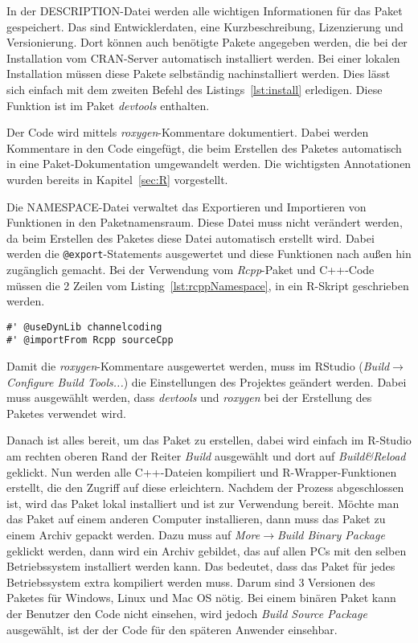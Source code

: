 In der DESCRIPTION-Datei werden alle wichtigen Informationen für das Paket gespeichert. Das sind Entwicklerdaten, eine Kurzbeschreibung, Lizenzierung und Versionierung. Dort können auch benötigte Pakete angegeben werden, die bei der Installation vom CRAN-Server automatisch installiert werden. Bei einer lokalen Installation müssen diese Pakete selbständig nachinstalliert werden. Dies lässt sich einfach mit dem zweiten Befehl des Listings~\ref{lst:install} erledigen. Diese Funktion ist im Paket \emph{devtools} enthalten. \cite[67-82]{wickham2015r}

Der Code wird mittels \emph{roxygen}-Kommentare dokumentiert. Dabei werden Kommentare in den Code eingefügt, die beim Erstellen des Paketes automatisch in eine Paket-Dokumentation umgewandelt werden. Die wichtigsten Annotationen wurden bereits in Kapitel~\ref{sec:R} vorgestellt. \cite[83-110]{wickham2015r}

Die NAMESPACE-Datei verwaltet das Exportieren und Importieren von Funktionen in den Paketnamensraum. Diese Datei muss nicht verändert werden, da beim Erstellen des Paketes diese Datei automatisch erstellt wird. Dabei werden die \texttt{@export}-Statements ausgewertet und diese Funktionen nach außen hin zugänglich gemacht. Bei der Verwendung vom \emph{Rcpp}-Paket und C++-Code müssen die 2 Zeilen vom Listing~\ref{lst:rcppNamespace}, in ein R-Skript geschrieben werden. \cite[144-160]{wickham2015r}

\begin{lstlisting}[caption=Nötige \emph{roxygen}-Kommentare bei der Verwendung von C++-Code, label={lst:rcppNamespace}, float=!th]
#' @useDynLib channelcoding
#' @importFrom Rcpp sourceCpp
\end{lstlisting}

Damit die \emph{roxygen}-Kommentare ausgewertet werden, muss im RStudio (\emph{Build$\rightarrow$Configure Build Tools...}) die Einstellungen des Projektes geändert werden. Dabei muss ausgewählt werden, dass \emph{devtools} und \emph{roxygen} bei der Erstellung des Paketes verwendet wird.

Danach ist alles bereit, um das Paket zu erstellen, dabei wird einfach im R-Studio am rechten oberen Rand der Reiter \emph{Build} ausgewählt und dort auf \emph{Build\&Reload} geklickt. Nun werden alle C++-Dateien kompiliert und R-Wrapper-Funktionen erstellt, die den Zugriff auf diese erleichtern. Nachdem der Prozess abgeschlossen ist, wird das Paket lokal installiert und ist zur Verwendung bereit. Möchte man das Paket auf einem anderen Computer installieren, dann muss das Paket zu einem Archiv gepackt werden. Dazu muss auf \emph{More$\rightarrow$Build Binary Package} geklickt werden, dann wird ein Archiv gebildet, das auf allen PCs mit den selben Betriebssystem installiert werden kann. Das bedeutet, dass das Paket für jedes Betriebssystem extra kompiliert werden muss. Darum sind 3 Versionen des Paketes für Windows, Linux und Mac OS nötig. Bei einem binären Paket kann der Benutzer den Code nicht einsehen, wird jedoch \emph{Build Source Package} ausgewählt, ist der der Code für den späteren Anwender einsehbar.   

